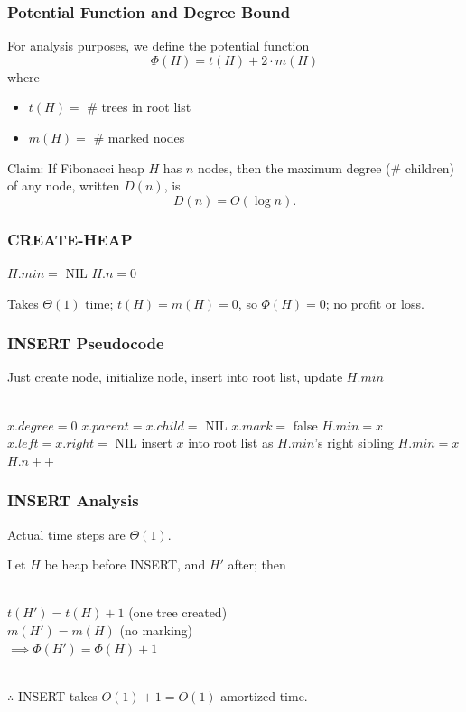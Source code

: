 \documentclass{beamer}
\newcommand{\stanza}{ \\~\ }
\begin{document}
\begin{frame} \frametitle{Potential Function and Degree Bound}
For analysis purposes, we define the potential function
\[ \Phi(H) = t(H) + 2 \cdot m(H) \]
where
\begin{itemize}
  \item $t(H) = $ \# trees in root list
  \item $m(H) = $ \# marked nodes
\end{itemize}

Claim: If Fibonacci heap $H$ has $n$ nodes, then the maximum degree (\# children) of any node,
written $D(n)$, is
\[ D(n) = O(\log n) .\]
\end{frame}

\begin{frame} \frametitle{CREATE-HEAP}
  \begin{algorithmic}[1]
    \State $H.min = $ NIL
    \State $H.n = 0$
    \State {}
    \EndFunction
  \end{algorithmic}
  \vspace{.5cm}
  Takes $\Theta(1)$ time; $t(H) = m(H) = 0$, so $\Phi(H) = 0$; no profit or loss.
\end{frame}

\begin{frame} \frametitle{INSERT Pseudocode}
Just create node, initialize node, insert into root list, update $H.min$ \stanza

{\small
\begin{algorithmic}[1]
  \State $x.degree = 0$
  \State $x.parent = x.child = $ NIL
  \State $x.mark = $ false
    \State $H.min = x$
    \State $x.left = x.right = $ NIL
  \Else
    \State insert $x$ into root list as $H.min$'s right sibling
      \State $H.min = x$
    \EndIf
  \EndIf
  \State $H.n++$
  \EndFunction
\end{algorithmic}
}
\end{frame}

\begin{frame} \frametitle{INSERT Analysis}
Actual time steps are $\Theta(1).$

Let $H$ be heap before INSERT, and $H'$ after; then \stanza

$t(H') = t(H) + 1$ (one tree created) \\
$m(H') = m(H)$ (no marking) \\
$\implies \Phi(H') = \Phi(H) + 1$ \stanza

$\therefore$ INSERT takes $O(1)+1 = O(1)$ amortized time.
\end{frame}
\end{document}
